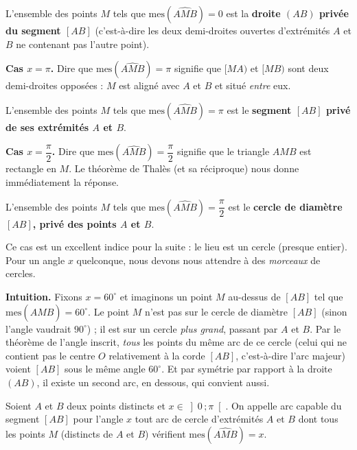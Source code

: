 \documentclass[11pt]{article}
\newcommand{\cle}[1]{{\popxbold\color{popdark}#1}}
\newcounter{popsec}
\newcounter{popsub}
\newcommand{\courssub}[1]{%
  \stepcounter{popsub}%
  \par\vspace{9pt}\noindent{\popxbold\fontsize{11.5}{13}\selectfont\color{popink}{\color{poporange}\thepopsec.\thepopsub}\hspace{6pt}#1}\par\nopagebreak\vspace{4pt}
}
\begin{document}
\begin{propriete}[Lieu pour $x = 0$]
L'ensemble des points $M$ tels que $\text{mes}(\widehat{AMB}) = 0$ est la \textbf{droite $(AB)$ privée du segment $[AB]$} (c'est-à-dire les deux demi-droites ouvertes d'extrémités $A$ et $B$ ne contenant pas l'autre point).
\end{propriete}

\textbf{Cas $x = \pi$.} Dire que $\text{mes}(\widehat{AMB}) = \pi$ signifie que $[MA)$ et $[MB)$ sont deux demi-droites opposées : $M$ est aligné avec $A$ et $B$ et situé \emph{entre} eux.

\begin{propriete}[Lieu pour $x = \pi$]
L'ensemble des points $M$ tels que $\text{mes}(\widehat{AMB}) = \pi$ est le \textbf{segment $[AB]$ privé de ses extrémités $A$ et $B$}.
\end{propriete}

\textbf{Cas $x = \dfrac{\pi}{2}$.} Dire que $\text{mes}(\widehat{AMB}) = \dfrac{\pi}{2}$ signifie que le triangle $AMB$ est rectangle en $M$. Le théorème de Thalès (et sa réciproque) nous donne immédiatement la réponse.

\begin{propriete}[Lieu pour $x = \dfrac{\pi}{2}$ : théorème de Thalès]
L'ensemble des points $M$ tels que $\text{mes}(\widehat{AMB}) = \dfrac{\pi}{2}$ est le \textbf{cercle de diamètre $[AB]$, privé des points $A$ et $B$}.
\end{propriete}

Ce cas est un excellent indice pour la suite : le lieu est un cercle (presque entier). Pour un angle $x$ quelconque, nous devons nous attendre à des \emph{morceaux} de cercles.

\courssub{Cas général : $0 < x < \pi$}

\textbf{Intuition.} Fixons $x = 60^{\circ}$ et imaginons un point $M$ au-dessus de $[AB]$ tel que $\text{mes}(\widehat{AMB}) = 60^{\circ}$. Le point $M$ n'est pas sur le cercle de diamètre $[AB]$ (sinon l'angle vaudrait $90^{\circ}$) ; il est sur un cercle \emph{plus grand}, passant par $A$ et $B$. Par le théorème de l'angle inscrit, \emph{tous} les points du même arc de ce cercle (celui qui ne contient pas le centre $O$ relativement à la corde $[AB]$, c'est-à-dire l'arc majeur) voient $[AB]$ sous le même angle $60^{\circ}$. Et par symétrie par rapport à la droite $(AB)$, il existe un second arc, en dessous, qui convient aussi.

\begin{definition}
Soient $A$ et $B$ deux points distincts et $x \in \left]0\,;\pi\right[$. On appelle \cle{arc capable} du segment $[AB]$ pour l'angle $x$ tout arc de cercle d'extrémités $A$ et $B$ dont tous les points $M$ (distincts de $A$ et $B$) vérifient $\text{mes}(\widehat{AMB}) = x$.
\end{definition}
\end{document}
